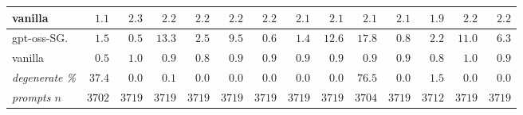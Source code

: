 \begin{table}[htbp]
\begin{tabular}{@{}l rrrrrr rrrrrrr@{}}
\quad vanilla & $1.1$ & $2.3$ & $2.2$ & $2.2$ & $2.2$ & $2.2$ & $2.1$ & $2.1$ & $2.1$ & $2.1$ & $1.9$ & $2.2$ & $2.2$ \\
\midrule
gpt-oss-SG. & $1.5$ & $0.5$ & $13.3$ & $2.5$ & $9.5$ & $0.6$ & $1.4$ & $12.6$ & $17.8$ & $0.8$ & $2.2$ & $11.0$ & $6.3$ \\
\quad vanilla & $0.5$ & $1.0$ & $0.9$ & $0.8$ & $0.9$ & $0.9$ & $0.9$ & $0.9$ & $0.9$ & $0.9$ & $0.8$ & $1.0$ & $0.9$ \\
\midrule
\emph{degenerate \%} & $37.4$ & $0.0$ & $0.1$ & $0.0$ & $0.0$ & $0.0$ & $0.0$ & $0.0$ & $76.5$ & $0.0$ & $1.5$ & $0.0$ & $0.0$ \\
\emph{prompts $n$} & $3702$ & $3719$ & $3719$ & $3719$ & $3719$ & $3719$ & $3719$ & $3719$ & $3704$ & $3719$ & $3712$ & $3719$ & $3719$ \\
\bottomrule
\end{tabular}

\end{table}
